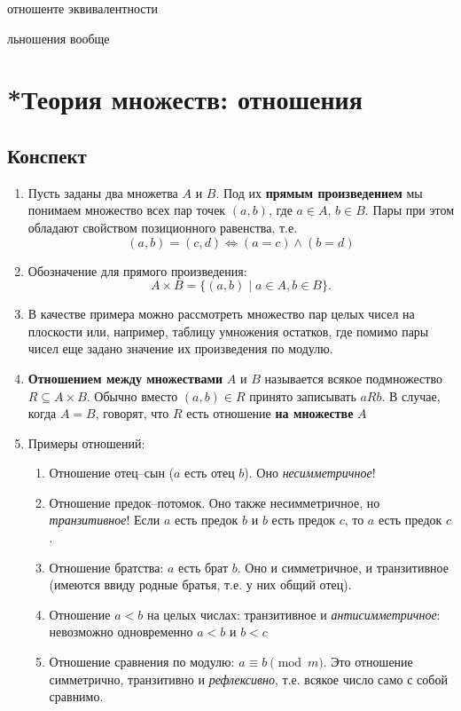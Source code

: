 отношенте эквивалентности

льношения вообще

\section{*Теория множеств: отношения}



\subsection*{Конспект}
\begin{enumerate}
\item Пусть заданы два множетва $A$ и $B$. Под их \textbf{прямым произведением} мы понимаем множество всех пар точек $(a,b)$, где $a\in A$, $b\in B$. Пары при этом обладают свойством позиционного равенства, т.е.
$$
(a,b)=(c,d) \iff (a=c)\land (b=d)
$$
\item Обозначение для прямого произведения:
$$
A\times B = \{(a,b)\mid a\in A, b\in B\}.
$$
\item В качестве примера можно рассмотреть множество пар целых чисел на плоскости или, например, таблицу умножения остатков, где помимо пары чисел еще задано значение их произведения по модулю.
\item \textbf{Отношением между множествами} $A$ и $B$ называется всякое подмножество $R\subseteq A\times B$. Обычно вместо $(a,b)\in R$ принято записывать $aRb$. В случае, когда $A=B$, говорят, что $R$ есть отношение \textbf{на множестве} $A$
\item Примеры отношений:
\begin{enumerate}[R1]
\item Отношение отец--сын ($a$ есть отец $b$). Оно \textit{несимметричное}!
\item Отношение предок--потомок. Оно также несимметричное, но \textit{транзитивное}! Если $a$ есть предок $b$ и $b$ есть предок $c$, то $a$ есть предок $c$.
\item Отношение братства: $a$ есть брат $b$. Оно и симметричное, и транзитивное (имеются ввиду родные братья, т.е. у них общий отец).
\item Отношение $a<b$ на целых числах: транзитивное и \textit{антисимметричное}: невозможно одновременно $a<b$ и $b<c$
\item Отношение сравнения по модулю: $a\equiv b\pmod m$. Это отношение симметрично, транзитивно и \textit{рефлексивно}, т.е. всякое число само с собой сравнимо.

\end{enumerate}
\end{enumerate}
